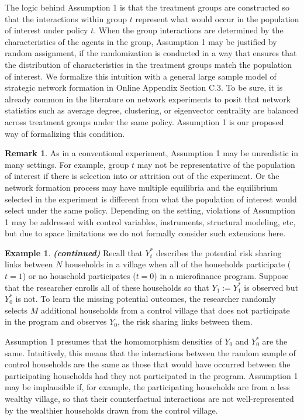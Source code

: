 \documentclass[12pt]{article}
\theoremstyle{definition}
\newtheorem{remark}{Remark}
\newtheorem{myexp}{Example}
\newenvironment{myexpcont}
{\addtocounter{myexp}{-1}\begin{myexp}{\textit{\textbf{{(continued)}}}}}
  {\end{myexp}}
\begin{document}
The logic behind Assumption 1 is that the treatment groups are constructed so that the interactions within group $t$ represent what would occur in the population of interest under policy $t$. When the group interactions are determined by the characteristics of the agents in the group, Assumption 1 may be justified by random assignment, if the randomization is conducted in a way that ensures that the distribution of characteristics in the treatment groups match the population of interest. We formalize this intuition with a general large sample model of strategic network formation in Online Appendix Section C.3. To be sure, it is already common in the literature on network experiments to posit that network statistics such as average degree, clustering, or eigenvector centrality are balanced across treatment groups under the same policy. Assumption 1 is our proposed way of formalizing this condition.  

\begin{remark}
As in a conventional experiment, Assumption 1 may be unrealistic in many settings. For example, group $t$ may not be representative of the population of interest if there is selection into or attrition out of the experiment. Or the network formation process may have multiple equilibria and the equilibrium selected in the experiment is different from what the population of interest would select under the same policy. Depending on the setting, violations of Assumption 1 may be addressed with control variables, instruments, structural modeling, etc, but due to space limitations we do not formally consider such extensions here. 
\end{remark}


\begin{myexpcont}
Recall that $Y_{t}^{*}$ describes the potential risk sharing links between $N$ households in a village when all of the households participate ($t = 1$) or no household participates ($t = 0$) in a microfinance program. Suppose that the researcher enrolls all of these households so that $Y_{1} := Y_{1}^{*}$ is observed but $Y_{0}^{*}$ is not. To learn the missing potential outcomes, the researcher randomly selects $M$ additional households from a control village that does not participate in the program and observes $Y_{0}$, the risk sharing links between them.  

Assumption 1 presumes that the homomorphism densities of $Y_{0}$  and $Y_{0}^{*}$ are the same. Intuitively, this means that the interactions between the random sample of control households are the same as those that would have occurred between the participating households had they not participated in the program. Assumption 1 may be implausible if, for example, the participating households are from a less wealthy village, so that their counterfactual interactions are not well-represented by the wealthier households drawn from the control village.   
\end{myexpcont}
\end{document}
